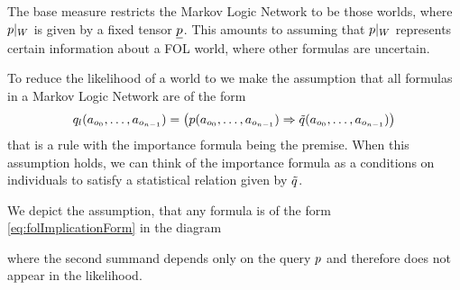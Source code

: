 The base measure restricts the Markov Logic Network to be those worlds, where ${p}|_{W}$ is given by a fixed tensor $\underline{p}$.
This amounts to assuming that ${p}|_{W}$ represents certain information about a FOL world, where other formulas are uncertain.



To reduce the likelihood of a world to we make the assumption that all formulas in a Markov Logic Network are of the form
\begin{align}\label{eq:folImplicationForm}
	q_{l}(a_{o_{0}},\ldots,a_{o_{n-1}}) =
	\left( p(a_{o_{0}},\ldots,a_{o_{n-1}}) \Rightarrow \tilde{q}(a_{o_{0}},\ldots,a_{o_{n-1}}) \right) 
\end{align}
that is a rule with the importance formula being the premise.
When this assumption holds, we can think of the importance formula as a conditions on individuals to satisfy a statistical relation given by $\tilde{q}$.

We depict the assumption, that any formula is of the form \eqref{eq:folImplicationForm} in the diagram
\begin{center}
	
\end{center}
where the second summand depends only on the query $p$ and therefore does not appear in the likelihood.







	







